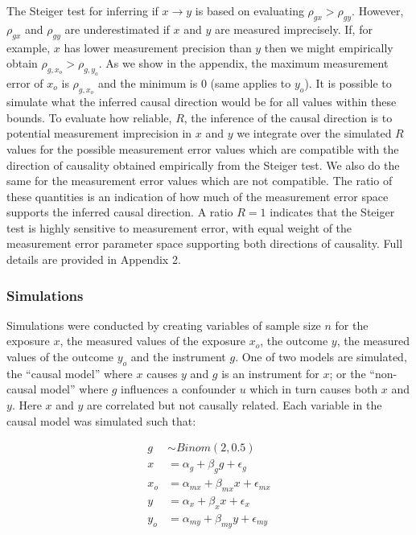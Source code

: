 \documentclass[]{article}
\begin{document}
The Steiger test for inferring if \(x \rightarrow y\) is based on
evaluating \(\rho_{gx} > \rho_{gy}\). However, \(\rho_{gx}\) and
\(\rho_{gy}\) are underestimated if \(x\) and \(y\) are measured
imprecisely. If, for example, \(x\) has lower measurement precision than
\(y\) then we might empirically obtain \(\rho_{g,x_o} > \rho_{g,y_o}\).
As we show in the appendix, the maximum measurement error of \(x_o\) is
\(\rho_{g,x_o}\) and the minimum is 0 (same applies to \(y_o\)). It is
possible to simulate what the inferred causal direction would be for all
values within these bounds. To evaluate how reliable, \(R\), the
inference of the causal direction is to potential measurement
imprecision in \(x\) and \(y\) we integrate over the simulated \(R\)
values for the possible measurement error values which are compatible
with the direction of causality obtained empirically from the Steiger
test. We also do the same for the measurement error values which are not
compatible. The ratio of these quantities is an indication of how much
of the measurement error space supports the inferred causal direction. A
ratio \(R=1\) indicates that the Steiger test is highly sensitive to
measurement error, with equal weight of the measurement error parameter
space supporting both directions of causality. Full details are provided
in Appendix 2.

\subsubsection{Simulations}\label{simulations}

Simulations were conducted by creating variables of sample size \(n\)
for the exposure \(x\), the measured values of the exposure \(x_o\), the
outcome \(y\), the measured values of the outcome \(y_o\) and the
instrument \(g\). One of two models are simulated, the ``causal model''
where \(x\) causes \(y\) and \(g\) is an instrument for \(x\); or the
``non-causal model'' where \(g\) influences a confounder \(u\) which in
turn causes both \(x\) and \(y\). Here \(x\) and \(y\) are correlated
but not causally related. Each variable in the causal model was
simulated such that:

\[
\begin{aligned}
g & \sim Binom(2, 0.5) \\
x & = \alpha_g + \beta_g g + \epsilon_g \\
x_o & = \alpha_{mx} + \beta_{mx} x + \epsilon_{mx} \\
y & = \alpha_x + \beta_x x + \epsilon_x \\
y_o & = \alpha_{my} + \beta_{my} y + \epsilon_{my} \\
\end{aligned}
\]
\end{document}
